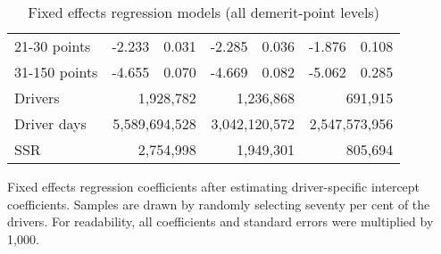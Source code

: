 \begin{table}
\begin{tabular}{l r r r r r r}
21-30 points  & -2.233  &  0.031  & -2.285  &  0.036  & -1.876  &  0.108   \\ 
 
31-150 points  & -4.655  &  0.070  & -4.669  &  0.082  & -5.062  &  0.285   \\ 
 

\hline 
 

Drivers 
 & \multicolumn{2}{r}{1,928,782}  & \multicolumn{2}{r}{1,236,868}  & \multicolumn{2}{r}{691,915}   \\ 
 

Driver days 
 & \multicolumn{2}{r}{5,589,694,528}  & \multicolumn{2}{r}{3,042,120,572}  & \multicolumn{2}{r}{2,547,573,956}   \\ 
 

SSR 
 & \multicolumn{2}{r}{2,754,998}  & \multicolumn{2}{r}{1,949,301}  & \multicolumn{2}{r}{805,694}   \\ 
 

\hline 
 
\end{tabular} 
\caption{Fixed effects regression models (all demerit-point levels)} 
Fixed effects regression coefficients after estimating driver-specific intercept coefficients. 
Samples are drawn by randomly selecting seventy per cent of the drivers. 
For readability, all coefficients and standard errors were multiplied by 1,000.
\label{tab:FE_regs_all_pts} 
\end{table} 
 
